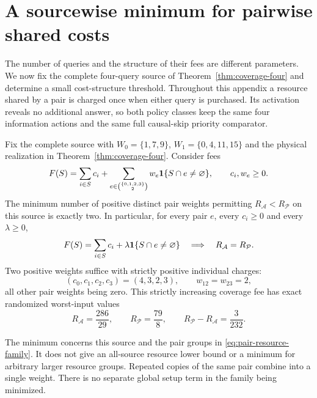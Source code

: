 \section{A sourcewise minimum for pairwise shared costs}
\label{app:pair-resource-support}
The number of queries and the structure of their fees are different
parameters. We now fix the complete four-query source of
Theorem~\ref{thm:coverage-four} and determine a small cost-structure
threshold. Throughout this appendix a resource shared by a pair is
charged once when either query is purchased. Its activation reveals no
additional answer, so both policy classes keep the same four information
actions and the same full causal-skip priority comparator.

\begin{theorem}
\label{thm:pair-resource-minimum}
Fix the complete source with
$W_0=\{1,7,9\}$, $W_1=\{0,4,11,15\}$ and the physical realization in
Theorem~\ref{thm:coverage-four}. Consider fees
\begin{equation}\label{eq:pair-resource-family}
 F(S)=\sum_{i\in S}c_i+
       \sum_{e\in\binom{\{0,1,2,3\}}2}
       w_e{\bf1}\{S\cap e\ne\varnothing\},\qquad c_i,w_e\geq0.
\end{equation}
The minimum number of positive distinct pair weights permitting
$R_{\mathcal A}<R_{\mathcal P}$ on this source is exactly two.
In particular, for every pair $e$, every $c_i\geq0$ and every
$\lambda\geq0$,
\[
 F(S)=\sum_{i\in S}c_i+\lambda{\bf1}\{S\cap e\ne\varnothing\}
 \quad\Longrightarrow\quad R_{\mathcal A}=R_{\mathcal P}.
\]
Two positive weights suffice with strictly positive individual charges:
\[
 (c_0,c_1,c_2,c_3)=(4,3,2,3),\qquad
 w_{12}=w_{23}=2,
\]
all other pair weights being zero. This strictly increasing coverage fee
has exact randomized worst-input values
\[
 R_{\mathcal A}=\frac{286}{29},\qquad
 R_{\mathcal P}=\frac{79}{8},\qquad
 R_{\mathcal P}-R_{\mathcal A}=\frac{3}{232}.
\]
\end{theorem}
The minimum concerns this source and the pair groups in
\eqref{eq:pair-resource-family}. It does not give an all-source resource
lower bound or a minimum for arbitrary larger resource groups. Repeated
copies of the same pair combine into a single weight. There is no separate
global setup term in the family being minimized.

